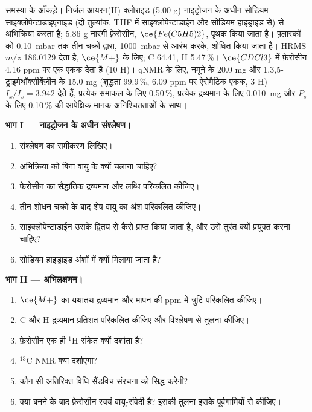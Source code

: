 \begin{problem}
\label{pb:b3:lab-techniques-3:1}
समस्या के आँकड़े। निर्जल आयरन(II) क्लोराइड (5.00 g) नाइट्रोजन के अधीन सोडियम
साइक्लोपेन्टाडाइएनाइड (दो तुल्यांक, THF में साइक्लोपेन्टाडाईन और सोडियम हाइड्राइड से)
से अभिक्रिया करता है; 5.86 g नारंगी फ़ेरोसीन, $\ce{Fe(C5H5)2}$, पृथक किया जाता है। फ़्लास्कों को
\qty{0.10}{mbar} तक तीन चक्रों द्वारा, \qty{1000}{mbar} से आरंभ करके, शोधित किया जाता है। HRMS $m/z$ 186.0129 देता है, $\ce{M+}$ के लिए;  C 64.41, H 5.47\,\%। $\ce{CDCl3}$ में फ़ेरोसीन 4.16 ppm पर एक एकक देता है (10 H)। qNMR के लिए,
नमूने के 20.0 mg और 1,3,5-ट्राइमेथॉक्सीबेंज़ीन के 15.0 mg (शुद्धता 99.9\,\%, 6.09 ppm पर ऐरोमैटिक
एकक, 3 H) $I_x/I_s = 3.942$ देते हैं, प्रत्येक समाकल के लिए 0.50\,\%,
प्रत्येक द्रव्यमान के लिए \qty{0.010}{mg} और $P_s$ के लिए 0.10\,\% की आपेक्षिक मानक अनिश्चितताओं के साथ।

\medskip\noindent\textbf{भाग I --- नाइट्रोजन के अधीन संश्लेषण।}
\begin{enumerate}
  \item संश्लेषण का समीकरण लिखिए।
  \item अभिक्रिया को बिना वायु के क्यों चलाना चाहिए?
  \item फ़ेरोसीन का सैद्धांतिक द्रव्यमान और लब्धि परिकलित कीजिए।
  \item तीन शोधन-चक्रों के बाद शेष वायु का अंश परिकलित कीजिए।
  \item साइक्लोपेन्टाडाईन उसके द्वितय से कैसे प्राप्त किया जाता है, और उसे तुरंत क्यों प्रयुक्त करना चाहिए?
  \item सोडियम हाइड्राइड अंशों में क्यों मिलाया जाता है?
\end{enumerate}

\medskip\noindent\textbf{भाग II --- अभिलक्षणन।}
\begin{enumerate}[resume]
  \item $\ce{M+}$ का यथातथ द्रव्यमान और मापन की ppm में त्रुटि परिकलित कीजिए।
  \item C और H द्रव्यमान-प्रतिशत परिकलित कीजिए और विश्लेषण से तुलना कीजिए।
  \item फ़ेरोसीन एक ही $^1$H संकेत क्यों दर्शाता है?
  \item $^{13}$C NMR क्या दर्शाएगा?
  \item कौन-सी अतिरिक्त विधि सैंडविच संरचना को सिद्ध करेगी?
  \item क्या बनने के बाद फ़ेरोसीन स्वयं वायु-संवेदी है? इसकी तुलना इसके पूर्वगामियों से कीजिए।
\end{enumerate}


\end{problem}
